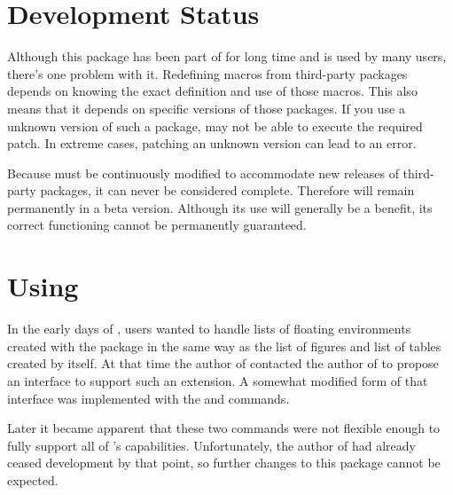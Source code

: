 \section{Development Status}
\label{scr:scrhack.draft}

Although this package has been part of \KOMAScript{} for long time and is used
by many users, there's one problem with it. Redefining macros from third-party
packages depends on knowing the exact definition and use of those macros. This
also means that it depends on specific versions of those packages. If you use
a unknown version of such a package,  may not be able to
execute the required patch. In extreme cases, patching an unknown version can
lead to an error.

Because  must be continuously modified to accommodate new
releases of third-party packages, it can never be considered complete.
Therefore  will remain permanently in a beta version.
Although its use will generally be a benefit, its correct functioning cannot
be permanently guaranteed.


\section{Using }

In the early days of \KOMAScript{}, users wanted to handle lists of floating
environments created with the
 package in the
same way as the list of figures and list of tables created by \KOMAScript{}
itself. At that time the author of \KOMAScript{} contacted the author of
 to propose an interface to support such an extension. A
somewhat modified form of that interface was implemented with the
 and
 commands.

Later it became apparent that these two commands were not flexible enough to
fully support all of \KOMAScript's capabilities. Unfortunately, the author of
 had already ceased development by that point, so further
changes to this package cannot be expected.

